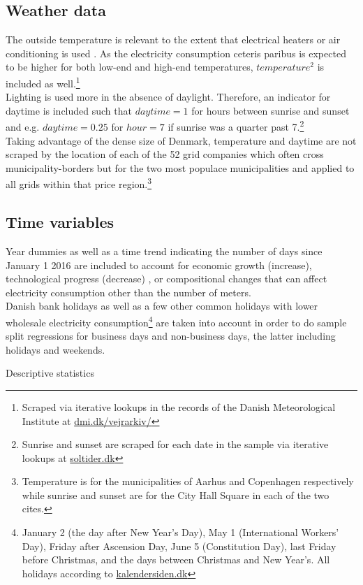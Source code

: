 \subsection{Weather data}
\label{subsec:d_weather}
The outside temperature is relevant to the extent that electrical heaters or air conditioning is used \citep{lijesen2007real, vesterberg2014residential}. As the electricity consumption ceteris paribus is expected to be higher for both low-end and high-end temperatures, $temperature^2$ is included as well.\footnote{Scraped via iterative lookups in the records of the Danish Meteorological Institute at \href{https://www.dmi.dk/vejrarkiv/}{dmi.dk/vejrarkiv/}}
\medskip\\
Lighting is used more in the absence of daylight. Therefore, an indicator for daytime is included such that $daytime=1$ for hours between sunrise and sunset and e.g. $daytime=0.25$ for $hour=7$ if sunrise was a quarter past 7.\footnote{Sunrise and sunset are scraped for each date in the sample via iterative lookups at \href{https://soltider.dk/}{soltider.dk}}
\medskip\\
Taking advantage of the dense size of Denmark, temperature and daytime are not scraped by the location of each of the 52 grid companies which often cross municipality-borders but for the two most populace municipalities and applied to all grids within that price region.\footnote{Temperature is for the municipalities of Aarhus and Copenhagen respectively while sunrise and sunset are for the City Hall Square in each of the two cites.}

\subsection{Time variables}
\label{subsec:d_time}
Year dummies as well as a time trend indicating the number of days since January 1 2016 are included to account for economic growth (increase), technological progress (decrease) \citep{lijesen2007real}, or compositional changes that can affect electricity consumption other than the number of meters.
\medskip\\
Danish bank holidays as well as a few other common holidays with lower wholesale electricity consumption\footnote{January 2 (the day after New Year's Day), May 1 (International Workers' Day), Friday after Ascension Day, June 5 (Constitution Day), last Friday before Christmas, and the days between Christmas and New Year's. All holidays according to \href{https://kalendersiden.dk/}{kalendersiden.dk}} are taken into account in order to do sample split regressions for business days and non-business days, the latter including holidays and weekends.
\begin{table}[H]
  \centering
  \caption{Descriptive statistics}
  \footnotesize
    
  \label{tab:descriptive}
\end{table}  

